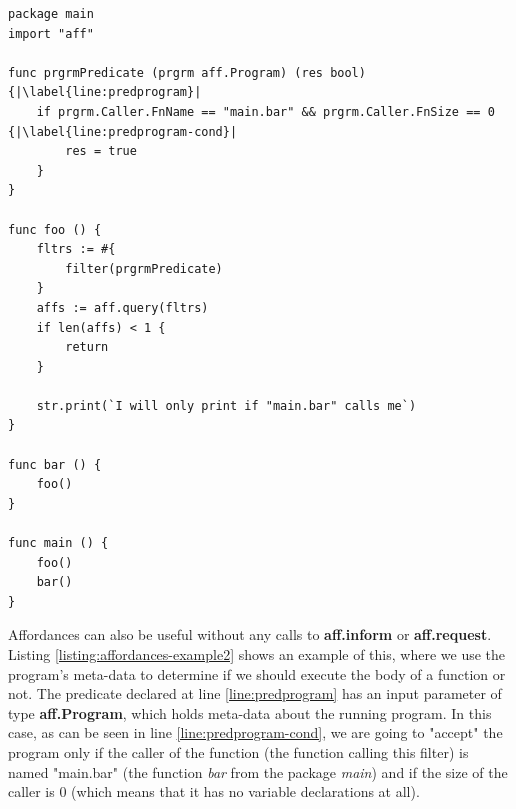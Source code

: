 \documentclass[11pt,fleqn,openany]{book} %
\begin{document}



\begin{lstlisting}[caption={Using affordances on an expression},captionpos=b,label={listing:affordances-example2}]
package main
import "aff"

func prgrmPredicate (prgrm aff.Program) (res bool) {|\label{line:predprogram}|
  	if prgrm.Caller.FnName == "main.bar" && prgrm.Caller.FnSize == 0 {|\label{line:predprogram-cond}|
		res = true
	}
}

func foo () {
  	fltrs := #{
		filter(prgrmPredicate)
  	}
  	affs := aff.query(fltrs)
  	if len(affs) < 1 {
  		return
  	}
	
  	str.print(`I will only print if "main.bar" calls me`)
}

func bar () {
 	foo()
}

func main () {
  	foo()
  	bar()
}
\end{lstlisting}

Affordances can also be useful without any calls to \textbf{aff.inform} or \textbf{aff.request}. Listing \ref{listing:affordances-example2} shows an example of this, where we use the program's meta-data to determine if we should execute the body of a function or not. The predicate declared at line \ref{line:predprogram} has an input parameter of type \textbf{aff.Program}, which holds meta-data about the running program. In this case, as can be seen in line \ref{line:predprogram-cond}, we are going to "accept" the program only if the caller of the function (the function calling this filter) is named "main.bar" (the function \textit{bar} from the package \textit{main}) and if the size of the caller is 0 (which means that it has no variable declarations at all).
\end{document}
